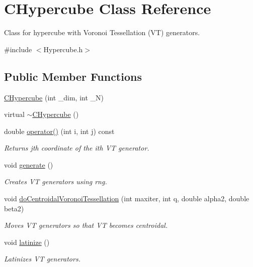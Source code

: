 \hypertarget{class_c_hypercube}{\section{C\-Hypercube Class Reference}
\label{class_c_hypercube}
}


Class for hypercube with Voronoi Tessellation (V\-T) generators.  




{\ttfamily \#include $<$Hypercube.\-h$>$}

\subsection*{Public Member Functions}
\begin{DoxyCompactItemize}
\item 
\hyperlink{class_c_hypercube_a3a62eb55c78f4a2f8b618d3dd45e4e7f}{C\-Hypercube} (int \-\_\-dim, int \-\_\-\-N)
\item 
virtual \hyperlink{class_c_hypercube_adea9be7c946bfd0051316c8129841d23}{$\sim$\-C\-Hypercube} ()
\item 
double \hyperlink{class_c_hypercube_a2bd2cdb7ffcd62e77e3a856e1e5b8e3e}{operator()} (int i, int j) const 
\begin{DoxyCompactList}\small\item\em Returns jth coordinate of the ith V\-T generator. \end{DoxyCompactList}\item 
void \hyperlink{class_c_hypercube_a6dc2a4fa2c97c2ae9b0e0c1fb0c5d860}{generate} ()
\begin{DoxyCompactList}\small\item\em Creates V\-T generators using rng. \end{DoxyCompactList}\item 
void \hyperlink{class_c_hypercube_a3a788118af6bcdd149b9191407db364b}{do\-Centroidal\-Voronoi\-Tessellation} (int maxiter, int q, double alpha2, double beta2)
\begin{DoxyCompactList}\small\item\em Moves V\-T generators so that V\-T becomes centroidal. \end{DoxyCompactList}\item 
void \hyperlink{class_c_hypercube_aefc832541d84a6c27d1682dbc1c7942d}{latinize} ()
\begin{DoxyCompactList}\small\item\em Latinizes V\-T generators. \end{DoxyCompactList}\end{DoxyCompactItemize}
